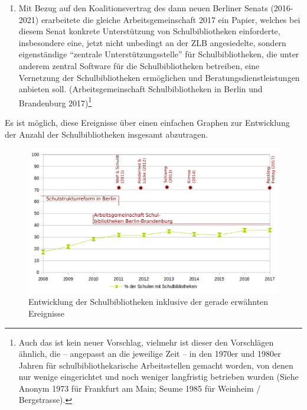 \documentclass[a4paper,
fontsize=11pt,
oneside,
numbers=noperiodatend,
parskip=half-,
bibliography=totoc,
final
]{scrartcl}
\begin{document}
\begin{enumerate}
  Die Arbeitsgemeinschaft publizierte ebenfalls 2013 ein Whitepaper zu
  einem offenbar dann eingestellten Projekt, eine schulbibliothekarische
  Arbeitsstelle an der Zentral- und Landesbibliothek Berlin (ZLB)
  einzurichten. Laut dieser gab es von 2011 bis 2013 ein Interesse der
  ZLB daran. (Hardtke-Flodell, Frübing \& Wolter 2013)\footnote{Diese
    Idee war auch nicht neu, vielmehr findet sie sich in Planung des
    Berliner Bibliothekswesens und Publikationen zur ZLB seit
    Jahrzehnten immer wieder, vergleiche als ein Beispiel den
    Bibliotheksentwicklungsplan für öffentliche Bibliotheken von
    1988/1990. (Senator für kulturelle Angelegenheiten 1998/1990)}
\item
  Mit Bezug auf den Koalitionsvertrag des dann neuen Berliner Senats
  (2016-2021) erarbeitete die gleiche Arbeitsgemeinschaft 2017 ein
  Papier, welches bei diesem Senat konkrete Unterstützung von
  Schulbibliotheken einforderte, insbesondere eine, jetzt nicht
  unbedingt an der ZLB angesiedelte, sondern eigenständige
  \enquote{zentrale Unterstützungsstelle} für Schulbibliotheken, die
  unter anderem zentral Software für die Schulbibliotheken betreiben,
  eine Vernetzung der Schulbibliotheken ermöglichen und
  Beratungsdienstleistungen anbieten soll. (Arbeitsgemeinschaft
  Schulbibliotheken in Berlin und Brandenburg 2017)\footnote{Auch das
    ist kein neuer Vorschlag, vielmehr ist dieser den Vorschlägen
    ähnlich, die -- angepasst an die jeweilige Zeit -- in den 1970er und
    1980er Jahren für schulbibliothekarische Arbeitsstellen gemacht
    worden, von denen nur wenige eingerichtet und noch weniger
    langfristig betrieben wurden (Siehe Anonym 1973 für Frankfurt am
    Main; Seume 1985 für Weinheim / Bergstrasse).}
\end{enumerate}

Es ist möglich, diese Ereignisse über einen einfachen Graphen zur
Entwicklung der Anzahl der Schulbibliotheken insgesamt abzutragen.

\begin{figure}
\centering
\includegraphics{img/abbildung.png}
\caption{Entwicklung der Schulbibliotheken inklusive der gerade
erwähnten Ereignisse}
\end{figure}
\end{document}
